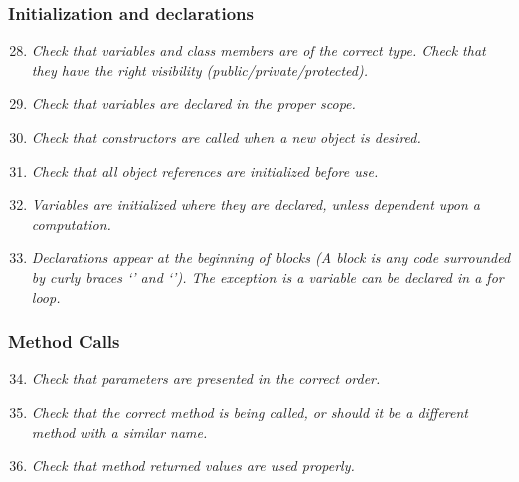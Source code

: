 	\subsubsection{Initialization and declarations}
		\begin{enumerate}
			\setcounter{enumi}{27}
			\item \textit{Check that variables and class members are of the correct type. Check that they have the right visibility (public/private/protected).}\newline

			\item \textit{Check that variables are declared in the proper scope.}\newline

			\item \textit{Check that constructors are called when a new object is desired.}\newline

			\item \textit{Check that all object references are initialized before use.}\newline

			\item \textit{Variables are initialized where they are declared, unless dependent upon a computation.}\newline

			\item \textit{Declarations appear at the beginning of blocks (A block is any code surrounded by curly braces ‘{’ and ‘}’). The exception is a variable can be declared in a for loop.}\newline

		\end{enumerate}

	\subsubsection{Method Calls}
		\begin{enumerate}
			\setcounter{enumi}{33}
			\item \textit{Check that parameters are presented in the correct order.}\newline

			\item \textit{Check that the correct method is being called, or should it be a different method with a similar name.}\newline

			\item \textit{Check that method returned values are used properly.}\newline

		\end{enumerate}

